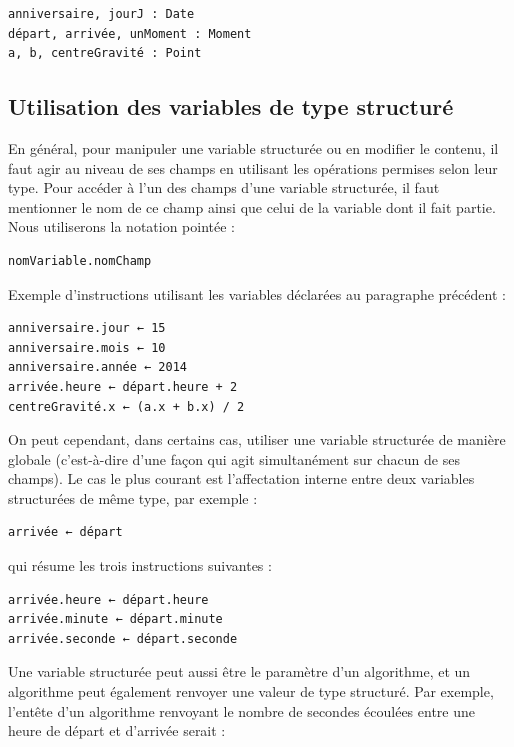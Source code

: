 \documentclass[11pt,a4paper]{article}
\begin{document}
            \par
        \begin{verbatim}
anniversaire, jourJ : Date
départ, arrivée, unMoment : Moment
a, b, centreGravité : Point
      \end{verbatim}\subsection{Utilisation des variables de type structur\'e}
		    En g\'en\'eral, pour manipuler une variable structur\'ee ou en modifier le contenu, il faut agir
        au niveau de ses champs en utilisant les op\'erations permises selon leur type. Pour acc\'eder \`a
        l'un des champs d'une variable structur\'ee, il faut mentionner le nom de ce champ ainsi que
        celui de la variable dont il fait partie. Nous utiliserons la notation \guillemotleft  point\'ee \guillemotright  :
      
            \par
        \begin{verbatim}
nomVariable.nomChamp
      \end{verbatim}
		    Exemple d'instructions utilisant les variables d\'eclar\'ees au paragraphe pr\'ec\'edent :
      
            \par
        \begin{verbatim}
anniversaire.jour ← 15
anniversaire.mois ← 10
anniversaire.année ← 2014
arrivée.heure ← départ.heure + 2
centreGravité.x ← (a.x + b.x) / 2
      \end{verbatim}
		    On peut cependant, dans certains cas, utiliser une variable structur\'ee de mani\`ere globale
        (c'est-\`a-dire d'une fa\c con qui agit simultan\'ement sur chacun de ses champs). Le cas le plus
        courant est l'affectation interne entre deux variables structur\'ees de m\^eme type, par exemple :
      
            \par
        \begin{verbatim}
arrivée ← départ
      \end{verbatim}
		    qui r\'esume les trois instructions suivantes :
      
            \par
        \begin{verbatim}
arrivée.heure ← départ.heure
arrivée.minute ← départ.minute
arrivée.seconde ← départ.seconde
      \end{verbatim}
		    Une variable structur\'ee peut aussi \^etre le param\`etre d'un algorithme, et un algorithme peut \'egalement 
		    renvoyer une \guillemotleft  valeur \guillemotright  de type structur\'e. Par exemple, l'ent\^ete d'un algorithme renvoyant
		    le nombre de secondes \'ecoul\'ees entre une heure de d\'epart et d'arriv\'ee serait :
      
\end{document}
